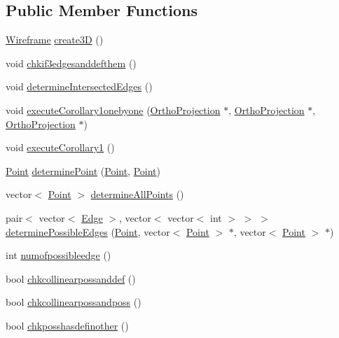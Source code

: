 \subsection*{Public Member Functions}
\begin{DoxyCompactItemize}
\item 
\hyperlink{class_wireframe}{Wireframe} \hyperlink{class_projection2_d_aa061602930f19acad32720f7067c58fa}{create3D} ()
\item 
void \hyperlink{class_projection2_d_a64751fc8527786d489d3e1f9dd613778}{chkif3edgesanddefthem} ()
\item 
void \hyperlink{class_projection2_d_a6be4ef41d013628ba91a3f1dbcc1f9bf}{determine\+Intersected\+Edges} ()
\item 
void \hyperlink{class_projection2_d_af65b18c0f1aed2c6bda79173ef6a0f5e}{execute\+Corollary1onebyone} (\hyperlink{class_ortho_projection}{Ortho\+Projection} $\ast$, \hyperlink{class_ortho_projection}{Ortho\+Projection} $\ast$, \hyperlink{class_ortho_projection}{Ortho\+Projection} $\ast$)
\item 
void \hyperlink{class_projection2_d_a7433a1a25a81f16a79c308d5dd7d98b5}{execute\+Corollary1} ()
\item 
\hyperlink{class_point}{Point} \hyperlink{class_projection2_d_a0185949b0711aa0a43bd2f66da9aaee7}{determine\+Point} (\hyperlink{class_point}{Point}, \hyperlink{class_point}{Point})
\item 
vector$<$ \hyperlink{class_point}{Point} $>$ \hyperlink{class_projection2_d_af2972a56d0f0fa6a9d01576d7021180d}{determine\+All\+Points} ()
\item 
pair$<$ vector$<$ \hyperlink{class_edge}{Edge} $>$, vector$<$ vector$<$ int $>$ $>$ $>$ \hyperlink{class_projection2_d_ad5f6fe26ce1a18cb5de2fe87e6b0869e}{determine\+Possible\+Edges} (\hyperlink{class_point}{Point}, vector$<$ \hyperlink{class_point}{Point} $>$ $\ast$, vector$<$ \hyperlink{class_point}{Point} $>$ $\ast$)
\item 
int \hyperlink{class_projection2_d_ad277ae374c9340f41f821e3b23aa6c04}{numofpossibleedge} ()
\item 
bool \hyperlink{class_projection2_d_af9a959f2c44a1801687dda170ba0d5d2}{chkcollinearpossanddef} ()
\item 
bool \hyperlink{class_projection2_d_a26179e263ee8be9bfbc260bedaea14c7}{chkcollinearpossandposs} ()
\item 
bool \hyperlink{class_projection2_d_a7b26c1f31633d19a33bdf54e8c47d3d8}{chkposshasdefinother} ()
\item 

\end{DoxyCompactItemize}

